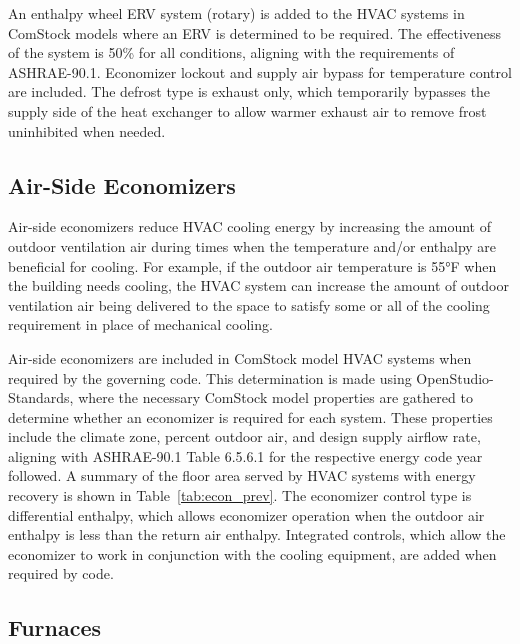 


An enthalpy wheel ERV system (rotary) is added to the HVAC systems in ComStock models where an ERV is determined to be required. The effectiveness of the system is 50\% for all conditions, aligning with the requirements of ASHRAE-90.1. Economizer lockout and supply air bypass for temperature control are included. The defrost type is exhaust only, which temporarily bypasses the supply side of the heat exchanger to allow warmer exhaust air to remove frost uninhibited when needed. 

\subsection{Air-Side Economizers}

Air-side economizers reduce HVAC cooling energy by increasing the amount of outdoor ventilation air during times when the temperature and/or enthalpy are beneficial for cooling. For example, if the outdoor air temperature is 55°F when the building needs cooling, the HVAC system can increase the amount of outdoor ventilation air being delivered to the space to satisfy some or all of the cooling requirement in place of mechanical cooling.

Air-side economizers are included in ComStock model HVAC systems when required by the governing code. This determination is made using OpenStudio-Standards, where the necessary ComStock model properties are gathered to determine whether an economizer is required for each system. These properties include the climate zone, percent outdoor air, and design supply airflow rate, aligning with ASHRAE-90.1 Table 6.5.6.1 for the respective energy code year followed. A summary of the floor area served by HVAC systems with energy recovery is shown in Table~\ref{tab:econ_prev}. The economizer control type is differential enthalpy, which allows economizer operation when the outdoor air enthalpy is less than the return air enthalpy. Integrated controls, which allow the economizer to work in conjunction with the cooling equipment, are added when required by code.  



\subsection{Furnaces}

